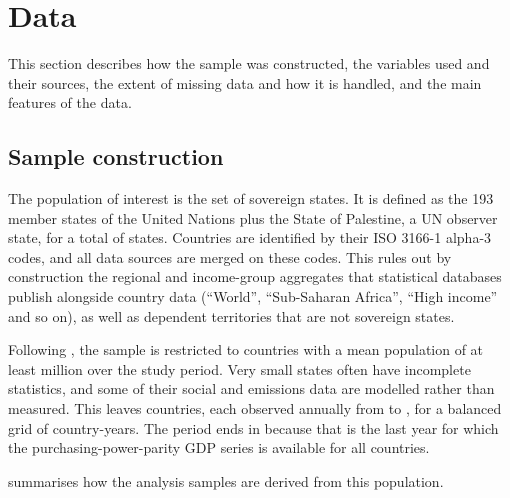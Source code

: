 \section{Data}\label{sec:data}

This section describes how the sample was constructed, the variables used and their sources, the extent of missing data and how it is handled, and the main features of the data.

\subsection{Sample construction}

The population of interest is the set of sovereign states. It is defined as the 193 member states of the United Nations plus the State of Palestine, a UN observer state, for a total of \nNStates{} states. Countries are identified by their ISO 3166-1 alpha-3 codes, and all data sources are merged on these codes. This rules out by construction the regional and income-group aggregates that statistical databases publish alongside country data (``World'', ``Sub-Saharan Africa'', ``High income'' and so on), as well as dependent territories that are not sovereign states.

Following \citet{fanning2022}, the sample is restricted to countries with a mean population of at least \nMinPopMillion{} million over the study period. Very small states often have incomplete statistics, and some of their social and emissions data are modelled rather than measured. This leaves \nNCountries{} countries, each observed annually from \nFirstYear{} to \nLastYear{}, for a balanced grid of country-years. The period ends in \nLastYear{} because that is the last year for which the purchasing-power-parity GDP series is available for all countries.

 summarises how the analysis samples are derived from this population.

